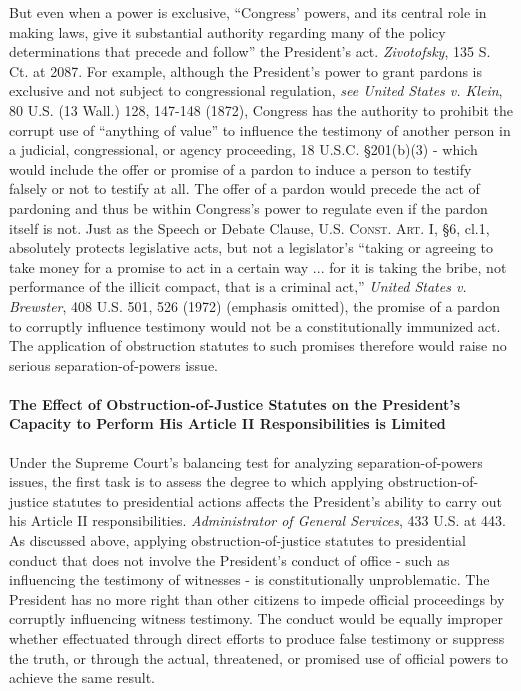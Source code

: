 But even when a power is exclusive, “Congress’ powers, and its central role in making laws, give it substantial authority regarding many of the policy determinations that precede and follow” the President’s act.
\textit{Zivotofsky}, 135 S. Ct. at 2087.
For example, although the President’s power to grant pardons is exclusive and not subject to congressional regulation, \textit{see United States v. Klein}, 80 U.S. (13 Wall.) 128, 147-148 (1872), Congress has the authority to prohibit the corrupt use of “anything of value” to influence the testimony of another person in a judicial, congressional, or agency proceeding, 18 U.S.C. \S 201(b)(3) - which would include the offer or promise of a pardon to induce a person to testify falsely or not to testify at all.
The offer of a pardon would precede the act of pardoning and thus be within Congress’s power to regulate even if the pardon itself is not.
Just as the Speech or Debate Clause, \textsc{U.S. Const. Art. I}, \S 6, cl.1, absolutely protects legislative acts, but not a legislator’s “taking or agreeing to take money for a promise to act in a certain way ... for it is taking the bribe, not performance of the illicit compact, that is a criminal act,” \textit{United States v. Brewster}, 408 U.S. 501, 526 (1972) (emphasis omitted), the promise of a pardon to corruptly influence testimony would not be a constitutionally immunized act.
The application of obstruction statutes to such promises therefore would raise no serious separation-of-powers issue.

\paragraph{The Effect of Obstruction-of-Justice Statutes on the President’s Capacity to Perform His Article II Responsibilities is Limited}

Under the Supreme Court’s balancing test for analyzing separation-of-powers issues, the first task is to assess the degree to which applying obstruction-of-justice statutes to presidential actions affects the President’s ability to carry out his Article II responsibilities.
\textit{Administrator of General Services}, 433 U.S. at 443.
As discussed above, applying obstruction-of-justice statutes to presidential conduct that does not involve the President’s conduct of office - such as influencing the testimony of witnesses - is constitutionally unproblematic.
The President has no more right than other citizens to impede official proceedings by corruptly influencing witness testimony.
The conduct would be equally improper whether effectuated through direct efforts to produce false testimony or suppress the truth, or through the actual, threatened, or promised use of official powers to achieve the same result.

